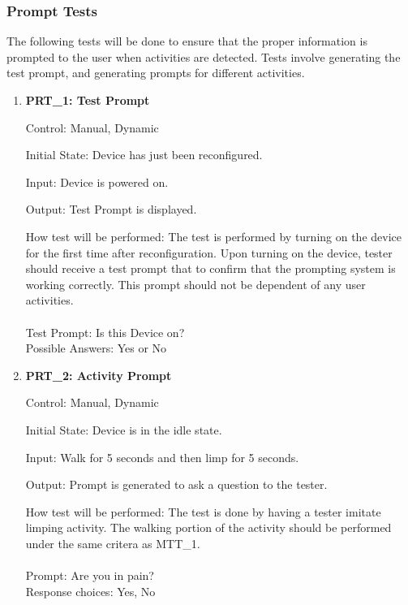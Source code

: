 \documentclass[12pt, titlepage]{article}
\begin{document}
\subsubsection{Prompt Tests}

The following tests will be done to ensure that the proper information is prompted to the user when activities are detected. Tests involve generating the test prompt, and generating prompts for different activities.

\begin{enumerate}
	\item{\textbf{PRT\_1: Test Prompt} \\}\label{PRT1}
	
		Control: Manual, Dynamic
							
		Initial State: Device has just been reconfigured.
							
		Input: Device is powered on.
		
		Output: Test Prompt is displayed.

		How test will be performed: The test is performed by turning on the device for the first time after reconfiguration. Upon turning on the device, tester should receive a test prompt that to confirm that the prompting system is working correctly. This prompt should not be dependent of any user activities.\\\\
		Test Prompt: Is this Device on?\\
		Possible Answers: Yes or No
		
	\item{\textbf{PRT\_2: Activity Prompt} \\}\label{PRT2}
	
		Control: Manual, Dynamic
							
		Initial State: Device is in the idle state.
							
		Input: Walk for 5 seconds and then limp for 5 seconds.
		
		Output: Prompt is generated to ask a question to the tester.
							
		How test will be performed: The test is done by having a tester imitate limping activity. The walking portion of the activity should be performed under the same critera as MTT\_1.\\\\
		Prompt: Are you in pain?\\
		Response choices: Yes, No
\end{enumerate}
\end{document}
